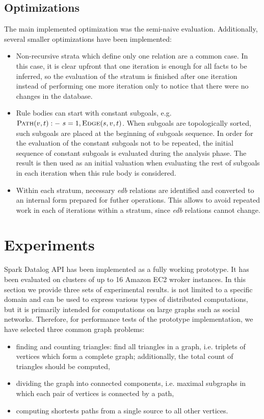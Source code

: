 \subsection{Optimizations}
The main implemented optimization was the semi-naive evaluation. Additionally, several smaller optimizations have been implemented:
\begin{itemize}
\item Non-recursive strata which define only one relation are a common case. In this case, it is clear upfront that one iteration is enough for all facts to be inferred, so the evaluation of the stratum is finished after one iteration instead of performing one more iteration only to notice that there were no changes in the database.
\item Rule bodies can start with constant subgoals, e.g. $\textsc{Path}(v,t) :-~s=1, \textsc{Edge}(s, v, t)$. When subgoals are topologically sorted, such subgoals are placed at the beginning of subgoals sequence. In order for the evaluation of the constant subgoals not to be repeated, the initial sequence of constant subgoals is evaluated during the analysis phase. The result is then used as an initial valuation when evaluating the rest of subgoals in each iteration when this rule body is considered.
\item Within each stratum, necessary \emph{edb} relations are identified and converted to an internal form prepared for futher operations. This allows to avoid repeated work in each of iterations within a stratum, since \emph{edb} relations cannot change.
\end{itemize}

\section{Experiments}\label{s:impl_eval}
Spark Datalog API has been implemented as a fully working prototype. It has been evaluated on clusters of up to 16 Amazon EC2 wroker instances. In this section we provide three sets of experimental results. \datalogra is not limited to a specific domain and can be used to express various types of distributed computations, but it is primarily intended for computations on large graphs such as social networks. Therefore, for performance tests of the prototype implementation, we have selected three common graph problems: 
\begin{itemize}
\item finding and counting triangles: find all triangles in a graph, i.e. triplets of vertices which form a complete graph; additionally, the total count of triangles should be computed,
\item dividing the graph into connected components, i.e. maximal subgraphs in which each pair of vertices is connected by a path,
\item computing shortests paths from a single source to all other vertices.
\end{itemize}

